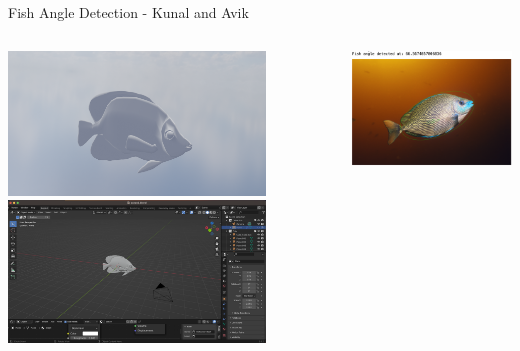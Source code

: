 \begin{frame}{Fish Angle Detection - Kunal and Avik}
    \begin{columns}
        \begin{column}{0.5\textwidth}
            \centering
            \includegraphics[height=0.8\textheight,width=0.8\textwidth,keepaspectratio]{fishImageBlender.png}
            \includegraphics[height=0.8\textheight,width=0.8\textwidth,keepaspectratio]{BlenderGUIScreenshot.png}
        \end{column}
        \begin{column}{0.5\textwidth}
            \centering
            \includegraphics[height=1\textheight,width=1\textwidth,keepaspectratio]{fish_angle.png}
        \end{column}
    \end{columns}
\end{frame}